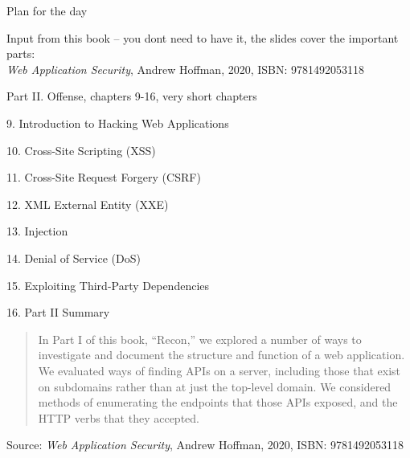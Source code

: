 \documentclass[Screen16to9,17pt]{foils}
\newcommand{\quotesize}{\fontsize{16pt}{20pt}\selectfont}
\begin{document}
Plan for the day



Input from this book -- you dont need to have it, the slides cover the important parts:\\
\emph{Web Application Security}, Andrew Hoffman, 2020, ISBN: 9781492053118
\begin{list1}
\item Part II. Offense, chapters 9-16, very short chapters
\item 9. Introduction to Hacking Web Applications
\item 10. Cross-Site Scripting (XSS)
\item 11. Cross-Site Request Forgery (CSRF)
\item 12. XML External Entity (XXE)
\item 13. Injection
\item 14. Denial of Service (DoS)
\item 15. Exploiting Third-Party Dependencies
\item 16. Part II Summary
\end{list1}



\begin{quote}\quotesize
In Part I of this book, “Recon,” we explored a number of ways to investigate and
document the structure and function of a web application. We evaluated ways of
finding APIs on a server, including those that exist on subdomains rather than at just the
top-level domain. We considered methods of enumerating the endpoints that those
APIs exposed, and the HTTP verbs that they accepted.
\end{quote}
Source: \emph{Web Application Security}, Andrew Hoffman, 2020, ISBN: 9781492053118
\end{document}
